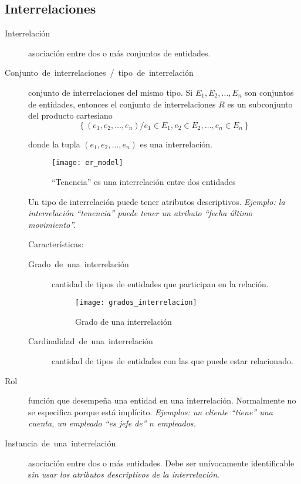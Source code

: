 \documentclass[a4paper, twoside]{article}
\begin{document}
\subsection{Interrelaciones}
\begin{description}
\item [{Interrelación}] asociación entre dos o más conjuntos de entidades.
\item [{Conjunto~de~interrelaciones~/~tipo~de~interrelación}] conjunto
de interrelaciones del mismo tipo. Si $E_{1},E_{2},\ldots,E_{n}$
son conjuntos de entidades, entonces el conjunto de interrelaciones
$R$ es un subconjunto del producto cartesiano 
\[
\left\{ \left(e_{1},e_{2},\ldots,e_{n}\right)/e_{1}\in E_{1},e_{2}\in E_{2},\ldots,e_{n}\in E_{n}\right\} 
\]



donde la tupla $\left(e_{1},e_{2},\ldots,e_{n}\right)$ es una interrelación.


\begin{figure}[H]
\noindent \begin{centering}
\texttt{[image: er\_model]}\protect\caption{``Tenencia'' es una interrelación entre dos entidades}

\par\end{centering}

\end{figure}



Un tipo de interrelación puede tener atributos descriptivos. \emph{Ejemplo:
la interrelación ``tenencia'' puede tener un atributo ``fecha último
movimiento''.}


Características:
\begin{description}
\item [{Grado~de~una~interrelación}] cantidad de tipos de entidades
que participan en la relación.


\begin{figure}[H]
\noindent \centering{}\texttt{[image: grados\_interrelacion]}\protect\caption{Grado de una interrelación}
\end{figure}


\item [{Cardinalidad~de~una~interrelación}] cantidad de tipos de entidades
con las que puede estar relacionado.
\end{description}
\item [{Rol}] función que desempeña una entidad en una interrelación. Normalmente
no se especifica porque está implícito. \emph{Ejemplos: un cliente
``tiene'' una cuenta, un empleado ``es jefe de'' $n$ empleados.}
\item [{Instancia~de~una~interrelación}] asociación entre dos o más
entidades. Debe ser unívocamente identificable s\emph{in usar los
atributos descriptivos de la interrelación}.
\end{description}
\end{document}
